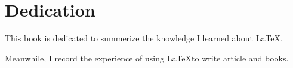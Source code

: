 \chapter{Dedication}
This book is dedicated to summerize the knowledge I learned about \LaTeX.

Meanwhile, I record the experience of using \LaTeX to write article and books.


